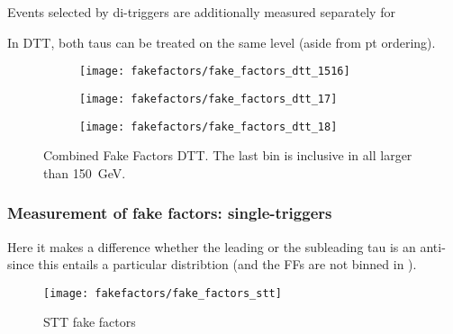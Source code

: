 Events selected by di-\tauhadvis triggers are additionally measured
separately for

In DTT, both taus can be treated on the same level (aside from pt
ordering).



\begin{figure}[htbp]
  \centering

  \begin{subfigure}{0.49\textwidth}
    \texttt{[image: fakefactors/fake\_factors\_dtt\_1516]}
  \end{subfigure}
  \begin{subfigure}{0.49\textwidth}
    \texttt{[image: fakefactors/fake\_factors\_dtt\_17]}
  \end{subfigure}

  \begin{subfigure}{0.49\textwidth}
    \texttt{[image: fakefactors/fake\_factors\_dtt\_18]}
  \end{subfigure}

  \caption{Combined Fake Factors DTT. The last bin is inclusive in all
    \pT larger than \SI{150}{\GeV}.}
  \label{fig:mjfakes_fake_factors}
\end{figure}


\subsubsection{Measurement of fake factors: single-\tauhadvis triggers}

Here it makes a difference whether the leading or the subleading tau
is an anti-\tauhadvis since this entails a particular \pT distribtion
(and the FFs are not binned in \pT).



\begin{figure}[htbp]
  \centering

  \texttt{[image: fakefactors/fake\_factors\_stt]}


  \caption{STT fake factors}
  \label{fig:mjfakes_stt_ffs}
\end{figure}


